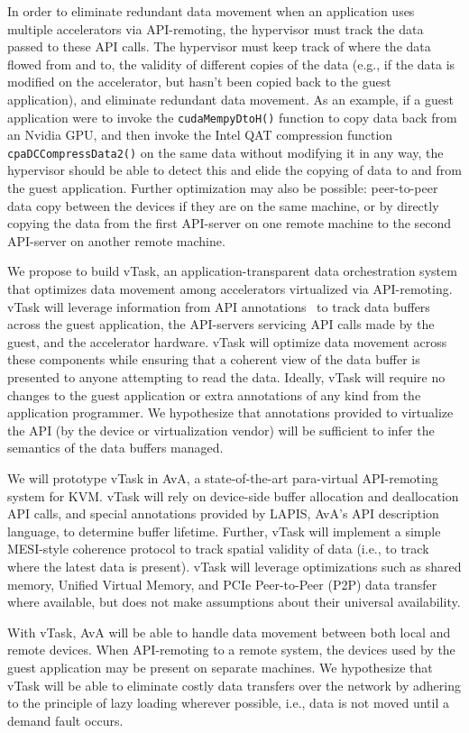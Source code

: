 In order to eliminate redundant data movement when an application uses
multiple accelerators via API-remoting, the hypervisor must track the data
passed to these API calls. The hypervisor must keep track of where the data
flowed from and to, the validity of different copies of the data (e.g., if the
data is modified on the accelerator, but hasn’t been copied back to the guest
application), and eliminate redundant data movement. As an example, if a guest
application were to invoke the \texttt{cudaMempyDtoH()} function to copy data
back from an Nvidia GPU, and then invoke the Intel QAT compression function
\texttt{cpaDCCompressData2()} on the same data without modifying it in any
way, the hypervisor should be able to detect this and elide the copying of
data to and from the guest application. Further optimization may also be
possible: peer-to-peer data copy between the devices if they are on the same
machine, or by directly copying the data from the first API-server on one
remote machine to the second API-server on another remote machine.

We propose to build vTask, an application-transparent data orchestration
system that optimizes data movement among accelerators virtualized via
API-remoting. vTask will leverage information from API
annotations~\cite{ava-hotos} to track data buffers across the guest
application, the API-servers servicing API calls made by the guest, and the
accelerator hardware. vTask will optimize data movement across these
components while ensuring that a coherent view of the data buffer is presented
to anyone attempting to read the data. Ideally, vTask will require no changes
to the guest application or  extra annotations of any kind from the
application programmer. We hypothesize that annotations provided to virtualize
the API (by the device or virtualization vendor) will be sufficient to infer
the semantics of the data buffers managed.

We will prototype vTask in AvA, a state-of-the-art para-virtual API-remoting
system for KVM. vTask will rely on device-side buffer allocation and
deallocation API calls, and special annotations provided by LAPIS, AvA’s API
description language, to determine buffer lifetime. Further, vTask will
implement a simple MESI-style coherence protocol to track spatial validity of
data (i.e., to track where the latest data is present). vTask will leverage
optimizations such as shared memory, Unified Virtual Memory, and PCIe
Peer-to-Peer (P2P) data transfer where available, but does not make
assumptions about their universal availability.

With vTask, AvA will be able to handle data movement between both local and
remote devices. When API-remoting to a remote system, the devices used by the
guest application may be present on separate machines. We hypothesize that
vTask will be able to eliminate costly data transfers over the network by
adhering to the principle of lazy loading wherever possible, i.e., data is not
moved until a demand fault occurs.

